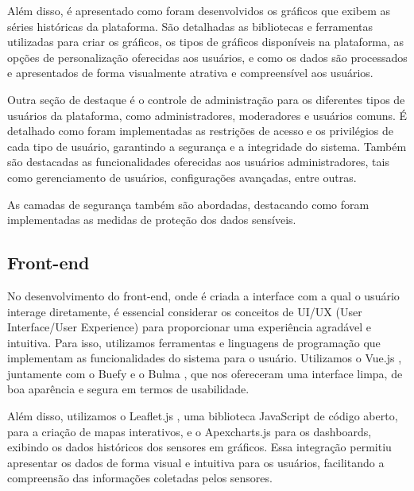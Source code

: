 \documentclass[tcc,capa]{texufpel}
\begin{document}
Além disso, é apresentado como foram desenvolvidos os gráficos que exibem as séries históricas da plataforma. São detalhadas as bibliotecas e ferramentas utilizadas para criar os gráficos, os tipos de gráficos disponíveis na plataforma, as opções de personalização oferecidas aos usuários, e como os dados são processados e apresentados de forma visualmente atrativa e compreensível aos usuários.

Outra seção de destaque é o controle de administração para os diferentes tipos de usuários da plataforma, como administradores, moderadores e usuários comuns. É detalhado como foram implementadas as restrições de acesso e os privilégios de cada tipo de usuário, garantindo a segurança e a integridade do sistema. Também são destacadas as funcionalidades oferecidas aos usuários administradores, tais como gerenciamento de usuários, configurações avançadas, entre outras.

As camadas de segurança também são abordadas, destacando como foram implementadas as medidas de proteção dos dados sensíveis.
\subsection{Front-end}
No desenvolvimento do front-end, onde é criada a interface com a qual o usuário interage diretamente, é essencial considerar os conceitos de UI/UX (User Interface/User Experience) para proporcionar uma experiência agradável e intuitiva. Para isso, utilizamos ferramentas e linguagens de programação que implementam as funcionalidades do sistema para o usuário. Utilizamos o Vue.js \cite{vue:2014}, juntamente com o Buefy \cite{buefy:2022} e o Bulma \cite{bulma:2022}, que nos ofereceram uma interface limpa, de boa aparência e segura em termos de usabilidade.

Além disso, utilizamos o Leaflet.js \cite{leaflet:2023}, uma biblioteca JavaScript de código aberto, para a criação de mapas interativos, e o Apexcharts.js \cite{ApexCharts:2022} para os dashboards, exibindo os dados históricos dos sensores em gráficos. Essa integração permitiu apresentar os dados de forma visual e intuitiva para os usuários, facilitando a compreensão das informações coletadas pelos sensores.
\end{document}
